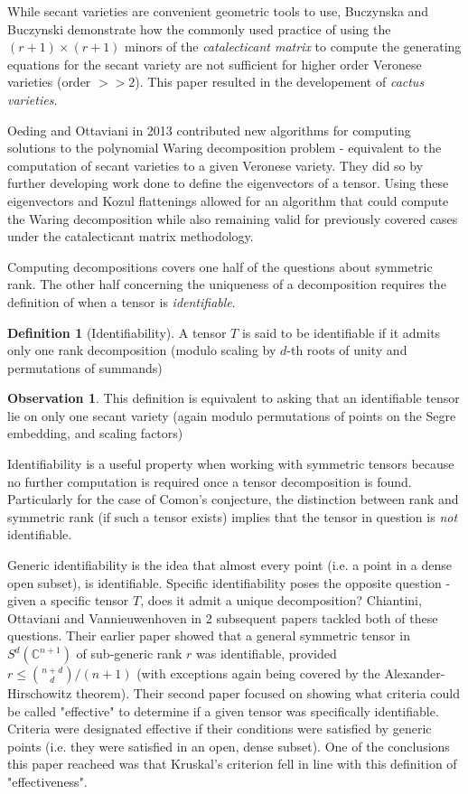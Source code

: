 \documentclass[12pt,a4paper,oneside]{book}
\def\complex{\mathbb{C}} %
\theoremstyle{definition}
\newtheorem{definition}{Definition}[section]
\newtheorem*{observation}{Observation}
\begin{document}
While secant varieties are convenient geometric tools to use, Buczynska and Buczynski\cite{buczynska_secant_2013} demonstrate how the commonly used practice of using the $(r+1) \times (r+1)$ minors of the \textit{catalecticant matrix} to compute the generating equations for the secant variety are not sufficient for higher order Veronese varieties (order $>> 2$). This paper resulted in the developement of \textit{cactus varieties.}

Oeding and Ottaviani \cite{oeding_eigenvectors_2013} in 2013 contributed new algorithms for computing solutions to the polynomial Waring decomposition problem - equivalent to the computation of secant varieties to a given Veronese variety. They did so by further developing work done to define the eigenvectors of a tensor. Using these eigenvectors and Kozul flattenings allowed for an algorithm that could compute the Waring decomposition while also remaining valid for previously covered cases under the catalecticant matrix methodology.

Computing decompositions covers one half of the questions about symmetric rank. The other half concerning the uniqueness of a decomposition requires the definition of when a tensor is \textit{identifiable}. 

\begin{definition}[Identifiability]\label{defn:identifiability}
    A tensor $T$ is said to be identifiable if it admits only one rank decomposition (modulo scaling by $d$-th roots of unity and permutations of summands)
\end{definition}
\begin{observation}
    This definition is equivalent to asking that an identifiable tensor lie on only one secant variety (again modulo permutations of points on the Segre embedding, and scaling factors)
\end{observation}
Identifiability is a useful property when working with symmetric tensors because no further computation is required once a tensor decomposition is found. Particularly for the case of Comon's conjecture, the distinction between rank and symmetric rank (if such a tensor exists) implies that the tensor in question is \textit{not} identifiable. 

Generic identifiability is the idea that almost every point (i.e. a point in a dense open subset), is identifiable. Specific identifiability poses the opposite question - given a specific tensor $T$, does it admit a unique decomposition? Chiantini, Ottaviani and Vannieuwenhoven \cite{chiantini_generic_2016, chiantini_effective_2017} in 2 subsequent papers tackled both of these questions. Their earlier paper showed that a general symmetric tensor in $S^d(\complex^{n+1})$ of sub-generic rank $r$ was identifiable, provided $r \leq \binom{n+d}{d}/(n+1)$ (with exceptions again being covered by the Alexander-Hirschowitz theorem). Their second paper focused on showing what criteria could be called "effective" to determine if a given tensor was specifically identifiable. Criteria were designated effective if their conditions were satisfied by generic points (i.e. they were satisfied in an open, dense subset). One of the conclusions this paper reacheed was that Kruskal's criterion fell in line with this definition of "effectiveness". 
\end{document}
